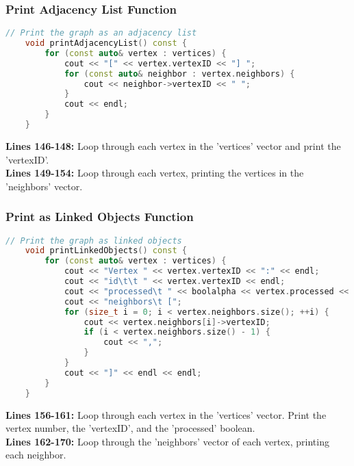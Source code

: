 \documentclass[letterpaper, 10pt,DIV=13]{scrartcl}
\numberwithin{equation}{section} %
\numberwithin{figure}{section} %
\numberwithin{table}{section} %
\begin{document}
\subsubsection{Print Adjacency List Function}
\begin{linenumbers}
\begin{lstlisting}[language=C++, caption={Print Adjacency List Function}, label={code:example}]
    // Print the graph as an adjacency list
    void printAdjacencyList() const {
        for (const auto& vertex : vertices) {
            cout << "[" << vertex.vertexID << "] ";
            for (const auto& neighbor : vertex.neighbors) {
                cout << neighbor->vertexID << " ";
            }
            cout << endl;
        }
    }

\end{lstlisting}
\end{linenumbers}
\nolinenumbers

\textbf{Lines 146-148:} Loop through each vertex in the 'vertices' vector and print the 'vertexID'. \\
\textbf{Lines 149-154:} Loop through each vertex, printing the vertices in the 'neighbors' vector.


\subsubsection{Print as Linked Objects Function}
\begin{linenumbers}
\begin{lstlisting}[language=C++, caption={Print as Linked Objects Function}, label={code:example}]
    // Print the graph as linked objects
    void printLinkedObjects() const {
        for (const auto& vertex : vertices) {
            cout << "Vertex " << vertex.vertexID << ":" << endl;
            cout << "id\t\t " << vertex.vertexID << endl;
            cout << "processed\t " << boolalpha << vertex.processed << endl;
            cout << "neighbors\t [";
            for (size_t i = 0; i < vertex.neighbors.size(); ++i) {
                cout << vertex.neighbors[i]->vertexID;
                if (i < vertex.neighbors.size() - 1) {
                    cout << ",";
                }
            }
            cout << "]" << endl << endl;
        }
    }

\end{lstlisting}
\end{linenumbers}
\nolinenumbers

\textbf{Lines 156-161:} Loop through each vertex in the 'vertices' vector. Print the vertex number, the 'vertexID', and the 'processed' boolean. \\
\textbf{Lines 162-170:} Loop through the 'neighbors' vector of each vertex, printing each neighbor.
\end{document}
